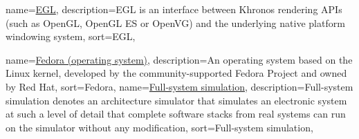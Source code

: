 \newcommand{\dvttermericsson}{Ericsson}
{
  name={\href{http://en.wikipedia.org/wiki/EGL_(API)}{EGL}},
  description={EGL is an interface between Khronos rendering APIs (such as OpenGL, OpenGL ES or OpenVG) and the underlying native platform windowing system},
  sort={EGL},
}
\newcommand{\dvttermegl}{\glslink{dvtglossegl}{EGL}}

{
    name={\href{http://en.wikipedia.org/wiki/Fedora_(operating_system)}{Fedora (operating system)}},
    description={An operating system based on the Linux kernel, developed by the community-supported Fedora Project and owned by Red Hat},
    sort={Fedora},
}
\newcommand{\dvttermfedora}{\glslink{dvtglossfedora}{Fedora 19}}
{
    name={\href{http://en.wikipedia.org/wiki/Full_system_simulator}{Full-system simulation}},
    description={Full-system simulation denotes an architecture simulator that simulates an electronic system at such a level of detail that complete software stacks from real systems can run on the simulator without any modification},
    sort={Full-system simulation},
}
\newcommand{\dvttermfullsystemsimulation}{\dvtcmdcaponcegloss{dvtglossfullsystemsimulation}{Full-system Simulation}}
\newcommand{\dvttermfreescalesemiconductor}{Freescale Semiconductor, Inc.}
\newcommand{\dvttermfps}{\dvtcmdabbrev{dvtglossfps}}

\newcommand{\dvttermgpu}{\dvtcmdabbrev{dvtglossgpu}}
\newcommand{\dvttermgpgpu}{\dvtcmdabbrev{dvtglossgpgpu}}
\newcommand{\dvttermgoogle}{Google}
\newcommand{\dvttermgeavionics}{GE Aviation}
\newcommand{\dvttermgui}{\dvtcmdabbrev{dvtglossgui}}

